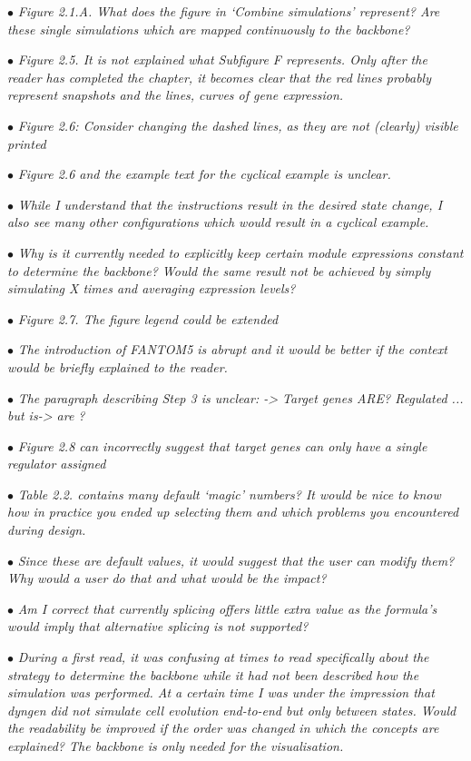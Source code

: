 \documentclass[10pt]{article}
\newcommand{\exam}[2][\  ]{\hspace{0pt}\marginpar{\color{red}#1}$\bullet$ \textit{#2}}
\newcommand{\imp}[1]{{\color{red} #1}}
\newcommand{\bigexclaim}{\raisebox{-0.1em}{\BigTriangleUp}\hspace{-0.32em}\llap{\small\textbf{!}}\hspace{0.32em}}
\newcommand{\tagimp}{\bigexclaim}
\newcommand{\tagtime}{{\Large $\hourglass$}}
\begin{document}
{\exam{Figure 2.1.A. What does the figure in ‘Combine simulations’ represent? Are
		these single simulations which are mapped continuously to the backbone?}

\exam{Figure 2.5. It is not explained what Subfigure F represents. Only after the
	reader has completed the chapter, it becomes clear that the red lines probably
	represent snapshots and the lines, curves of gene expression.}

\exam{Figure 2.6: Consider changing the dashed lines, as they are not (clearly)
		visible printed}
	
\exam{Figure 2.6 and the example text for the cyclical example is unclear.}

\exam{While I
		understand that the instructions result in the desired state change, I also see
		many other configurations which would result in a cyclical example.}
	
\exam{Why is it currently needed to explicitly keep certain module expressions constant to
		determine the backbone? Would the same result not be achieved by simply
		simulating X times and averaging expression levels?}

\exam{Figure 2.7. The figure legend could be extended}

\exam{The introduction of FANTOM5 is abrupt and it would be better if the context
		would be briefly explained to the reader.}
	
\exam{The paragraph describing Step 3 is unclear: -> Target genes ARE? Regulated
		... but is-> are ?}

\exam{Figure 2.8 can incorrectly suggest that target genes can only have a single
		regulator assigned}


\exam[\tagimp \tagtime]{\imp{Table 2.2. contains many default ‘magic’ numbers?} It would be nice to know
		how in practice you ended up selecting them and which problems you
		encountered during design.}


\exam{Since these are default values, it would suggest
		that the user can modify them? Why would a user do that and what would be
		the impact?}
	
\exam{Am I correct that currently splicing offers little extra value as the formula’s
		would imply that alternative splicing is not supported?}


\exam[\tagimp \tagtime]{\imp{During a first read, it was confusing at times to read specifically about the
	strategy to determine the backbone while it had not been described how the
	simulation was performed.} At a certain time I was under the impression that
	dyngen did not simulate cell evolution end-to-end but only between states.
	Would the readability be improved if the order was changed in which the
	concepts are explained? The backbone is only needed for the visualisation.}


}
\end{document}

